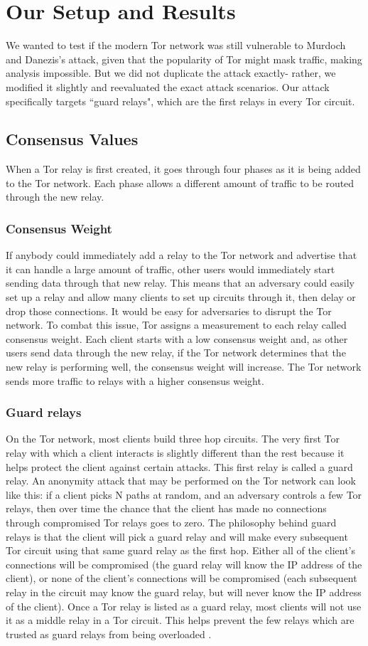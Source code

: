\documentclass[12pt,journal]{IEEEtran}
\begin{document}
\section{Our Setup and Results}
We wanted to test if the modern Tor network was still vulnerable to Murdoch and Danezis's attack, given that the popularity of Tor might mask traffic, making analysis impossible. But we did not duplicate the attack exactly- rather, we modified it slightly and reevaluated the exact attack scenarios. Our attack specifically targets ``guard relays", which are the first relays in every Tor circuit.
\subsection{Consensus Values}
When a Tor relay is first created, it goes through four phases as it is being added to the Tor network. Each phase allows a different amount of traffic to be routed through the new relay.
\subsubsection{Consensus Weight}
If anybody could immediately add a relay to the Tor network and advertise that it can handle a large amount of traffic, other users would immediately start sending data through that new relay. This means that an adversary could easily set up a relay and allow many clients to set up circuits through it, then delay or drop those connections. It would be easy for adversaries to disrupt the Tor network. To combat this issue, Tor assigns a measurement to each relay called consensus weight. Each client starts with a low consensus weight and, as other users send data through the new relay, if the Tor network determines that the new relay is performing well, the consensus weight will increase. The Tor network sends more traffic to relays with a higher consensus weight.
\subsubsection{Guard relays}
On the Tor network, most clients build three hop circuits. The very first Tor relay with which a client interacts is slightly different than the rest because it helps protect the client against certain attacks. This first relay is called a guard relay. An anonymity attack that may be performed on the Tor network can look like this: if a client picks N paths at random, and an adversary controls a few Tor relays, then over time the chance that the client has made no connections through compromised Tor relays goes to zero. The philosophy behind guard relays is that the client will pick a guard relay and will make every subsequent Tor circuit using that same guard relay as the first hop. Either all of the client's connections will be compromised (the guard relay will know the IP address of the client), or none of the client's connections will be compromised (each subsequent relay in the circuit may know the guard relay, but will never know the IP address of the client). Once a Tor relay is listed as a guard relay, most clients will not use it as a middle relay in a Tor circuit. This helps prevent the few relays which are trusted as guard relays from being overloaded \cite{arma2013}.
\end{document}
